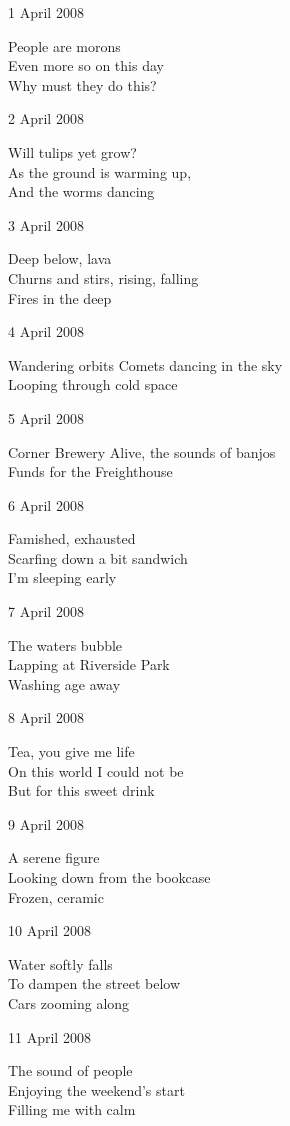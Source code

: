 \documentclass[12pt]{article}
\begin{document}
1 April 2008

People are morons \\
Even more so on this day \\
Why must they do this? 

2 April 2008

Will tulips yet grow? \\
As the ground is warming up, \\
And the worms dancing

\newpage

3 April 2008

Deep below, lava \\
Churns and stirs, rising, falling \\
Fires in the deep

4 April 2008

Wandering orbits
Comets dancing in the sky \\
Looping through cold space

5 April 2008

Corner Brewery 
Alive, the sounds of banjos \\
Funds for the Freighthouse

6 April 2008

Famished, exhausted \\
Scarfing down a bit sandwich \\
I'm sleeping early

7 April 2008

The waters bubble \\
Lapping at Riverside Park \\
Washing age away

8 April 2008

Tea, you give me life \\
On this world I could not be \\
But for this sweet drink

9 April 2008

A serene figure \\
Looking down from the bookcase \\
Frozen, ceramic

\newpage

10 April 2008

Water softly falls \\
To dampen the street below \\
Cars zooming along

11 April 2008

The sound of people \\
Enjoying the weekend's start \\
Filling me with calm
\end{document}
